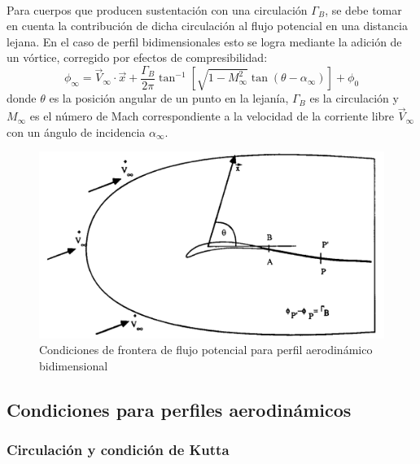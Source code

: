 \documentclass[letterpaper, openright, 12pt]{book}
\begin{document}
    \paragraph*{}
        Para cuerpos que producen sustentación con una circulación $\Gamma_{B}$,
        se debe tomar en cuenta la contribución de dicha circulación al flujo
        potencial en una distancia lejana. En el caso de perfil bidimensionales
        esto se logra mediante la adición de un vórtice, corregido por efectos
        de compresibilidad:
        \begin{equation}
            \phi_{\infty} = \vec{V}_{\infty} \cdot \vec{x}
                            + \frac{\Gamma_B}{2 \pi} \tan^{-1}
                                \left[ \sqrt{1-M_{\infty}^{2}}
                                \tan(\theta - \alpha_{\infty}) \right] + \phi_{0}
        \end{equation}
        donde $\theta$ es la posición angular de un punto en la lejanía,
        $\Gamma_B$ es la circulación y $M_\infty$ es el número de Mach
        correspondiente a la velocidad de la corriente libre $\vec{V}_\infty$
        con un ángulo de incidencia $\alpha_{\infty}$.

        \begin{figure}[htbp!]
            \centering
            \includegraphics[keepaspectratio, width=115mm]{./img/circulacion_phi}
            \caption[Condiciones de frontera de flujo potencial]{Condiciones de
                frontera de flujo potencial para perfil aerodinámico
                bidimensional\cite{potential_flow}}
            \label{phi_circulacion_malla}
        \end{figure}

    \subsection{Condiciones para perfiles aerodinámicos}
    \subsubsection{Circulación y condición de Kutta}
\end{document}
